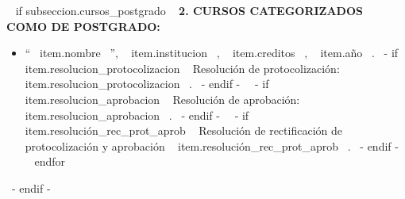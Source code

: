     ~{ if subseccion.cursos_postgrado }~
      \textbf{2. CURSOS CATEGORIZADOS COMO DE POSTGRADO:}
      \begin{itemize}
      ~{ for item in subseccion.cursos_postgrado }~
        \item ``~{{ item.nombre }}~'', ~{{ item.institucion }}~, ~{{ item.creditos }}~, ~{{ item.año }}~.
              ~{- if item.resolucion_protocolizacion }~ Resolución de protocolización: ~{{ item.resolucion_protocolizacion }}~. ~{- endif -}~
              ~{- if item.resolucion_aprobacion }~ Resolución de aprobación: ~{{ item.resolucion_aprobacion }}~. ~{- endif -}~
              ~{- if item.resolución_rec_prot_aprob }~ Resolución de rectificación de protocolización y aprobación ~{{ item.resolución_rec_prot_aprob }}~. ~{- endif -}~
        \espacioEntreItems{}
      ~{ endfor }~
      \end{itemize}
      \espacioEntreSubSecciones{}
    ~{- endif -}~


